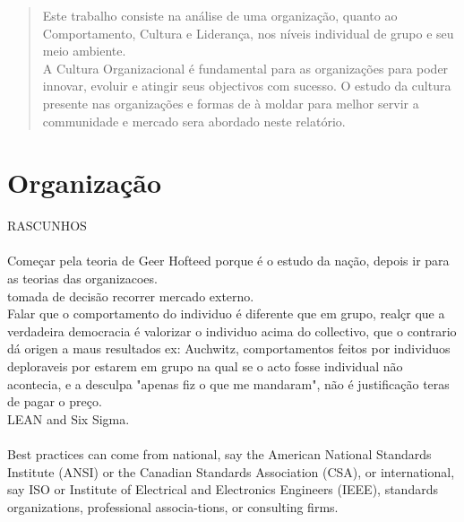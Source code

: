 
%

%
\tableofcontents
%
%
\pagestyle{plain} %
\newpage
\label{Resumo}
\begin{abstract} 
Este trabalho consiste na análise de uma organização, quanto ao Comportamento, Cultura e Liderança,
nos níveis individual de grupo e seu meio ambiente.\\

A Cultura Organizacional é fundamental para as organizações para poder innovar, evoluir e atingir seus objectivos com sucesso. O estudo da cultura presente nas organizações e formas de à moldar para melhor servir a communidade e mercado sera abordado neste relatório.
\end{abstract}
\newpage
\section{Organização}

RASCUNHOS \\ \\

Começar pela teoria de Geer Hofteed porque é o estudo da nação, depois ir para as teorias das organizacoes.\\
tomada de decisão recorrer mercado externo.\\

Falar que o comportamento do individuo é diferente que em grupo, realçr que a verdadeira democracia é valorizar o individuo acima do collectivo, que o contrario dá origen a maus resultados ex: Auchwitz, comportamentos feitos por individuos deploraveis por estarem em grupo na qual se o acto fosse individual não acontecia, e a desculpa "apenas fiz o que me mandaram", não é justificação teras de pagar o preço.\\


LEAN and Six Sigma.\\
\\
Best practices can come from national, say the American National Standards Institute (ANSI) or the Canadian Standards Association (CSA), or international, say ISO or Institute of Electrical and Electronics Engineers (IEEE), standards organizations, professional associa-tions, or consulting firms.\\

